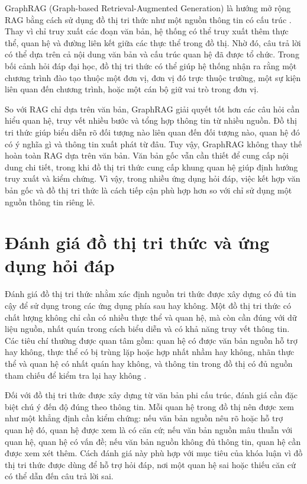 GraphRAG (Graph-based Retrieval-Augmented Generation) là hướng mở rộng RAG bằng cách sử dụng đồ thị tri thức như một nguồn thông tin có cấu trúc \cite{edge2024local}. Thay vì chỉ truy xuất các đoạn văn bản, hệ thống có thể truy xuất thêm thực thể, quan hệ và đường liên kết giữa các thực thể trong đồ thị. Nhờ đó, câu trả lời có thể dựa trên cả nội dung văn bản và cấu trúc quan hệ đã được tổ chức. Trong bối cảnh hỏi đáp đại học, đồ thị tri thức có thể giúp hệ thống nhận ra rằng một chương trình đào tạo thuộc một đơn vị, đơn vị đó trực thuộc trường, một sự kiện liên quan đến chương trình, hoặc một cán bộ giữ vai trò trong đơn vị.

So với RAG chỉ dựa trên văn bản, GraphRAG giải quyết tốt hơn các câu hỏi cần hiểu quan hệ, truy vết nhiều bước và tổng hợp thông tin từ nhiều nguồn. Đồ thị tri thức giúp biểu diễn rõ đối tượng nào liên quan đến đối tượng nào, quan hệ đó có ý nghĩa gì và thông tin xuất phát từ đâu. Tuy vậy, GraphRAG không thay thế hoàn toàn RAG dựa trên văn bản. Văn bản gốc vẫn cần thiết để cung cấp nội dung chi tiết, trong khi đồ thị tri thức cung cấp khung quan hệ giúp định hướng truy xuất và kiểm chứng. Vì vậy, trong nhiều ứng dụng hỏi đáp, việc kết hợp văn bản gốc và đồ thị tri thức là cách tiếp cận phù hợp hơn so với chỉ sử dụng một nguồn thông tin riêng lẻ.

\section{Đánh giá đồ thị tri thức và ứng dụng hỏi đáp}

Đánh giá đồ thị tri thức nhằm xác định nguồn tri thức được xây dựng có đủ tin cậy để sử dụng trong các ứng dụng phía sau hay không. Một đồ thị tri thức có chất lượng không chỉ cần có nhiều thực thể và quan hệ, mà còn cần đúng với dữ liệu nguồn, nhất quán trong cách biểu diễn và có khả năng truy vết thông tin. Các tiêu chí thường được quan tâm gồm: quan hệ có được văn bản nguồn hỗ trợ hay không, thực thể có bị trùng lặp hoặc hợp nhất nhầm hay không, nhãn thực thể và quan hệ có nhất quán hay không, và thông tin trong đồ thị có đủ nguồn tham chiếu để kiểm tra lại hay không \cite{hogan2021knowledge,weikum2021machine}.

Đối với đồ thị tri thức được xây dựng từ văn bản phi cấu trúc, đánh giá cần đặc biệt chú ý đến độ đúng theo thông tin. Mỗi quan hệ trong đồ thị nên được xem như một khẳng định cần kiểm chứng: nếu văn bản nguồn nêu rõ hoặc hỗ trợ quan hệ đó, quan hệ được xem là có căn cứ; nếu văn bản nguồn mâu thuẫn với quan hệ, quan hệ có vấn đề; nếu văn bản nguồn không đủ thông tin, quan hệ cần được xem xét thêm. Cách đánh giá này phù hợp với mục tiêu của khóa luận vì đồ thị tri thức được dùng để hỗ trợ hỏi đáp, nơi một quan hệ sai hoặc thiếu căn cứ có thể dẫn đến câu trả lời sai.


